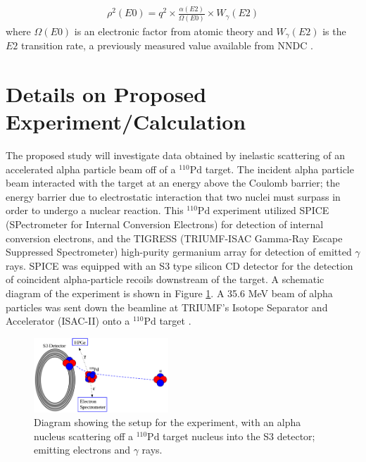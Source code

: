 \documentclass[twocolumn,preprintnumbers,amsmath,amssymb]{revtex4}
\begin{document}
\begin{gather}
\rho^2(E0) = q^2 \times \frac{\alpha(E2)}{\Omega(E0)} \times W_\gamma(E2)
\label{E0Strength}
\end{gather}
where $\Omega(E0)$ is an electronic factor from atomic theory and $W_\gamma(E2)$ is the $E2$ transition rate, a previously measured value available from NNDC \cite{NNDC}.

\section{Details on Proposed Experiment/Calculation} 
The proposed study will investigate data obtained by inelastic scattering of an accelerated alpha particle beam off of a $^{110}\mathrm{Pd}$ target. The incident alpha particle beam interacted with the target at an energy above the Coulomb barrier; the energy barrier due to electrostatic interaction that two nuclei must surpass in order to undergo a nuclear reaction. This $^{110}\mathrm{Pd}$ experiment utilized SPICE (SPectrometer for Internal Conversion Electrons) for detection of internal conversion electrons, and the TIGRESS (TRIUMF-ISAC Gamma-Ray Escape Suppressed Spectrometer) high-purity germanium array for detection of emitted $\gamma$ rays. SPICE was equipped with an S3 type silicon CD detector for the detection of coincident alpha-particle recoils downstream of the target. A schematic diagram of the experiment is shown in Figure \ref{diagram}. A 35.6 MeV beam of alpha particles was sent down the beamline at TRIUMF's Isotope Separator and Accelerator (ISAC-II) onto a $^{110}\mathrm{Pd}$ target \cite{SPICE,TIGRESS}. 
\begin{figure}[!ht]
  \centering
  \includegraphics[width=0.45\textwidth,keepaspectratio]{ExperimentSchematic.png}
  \caption{Diagram showing the setup for the experiment, with an alpha nucleus scattering off a $^{110}\mathrm{Pd}$ target nucleus into the S3 detector; emitting electrons and $\gamma$ rays.}
  \label{diagram}
\end{figure}

\end{document}
